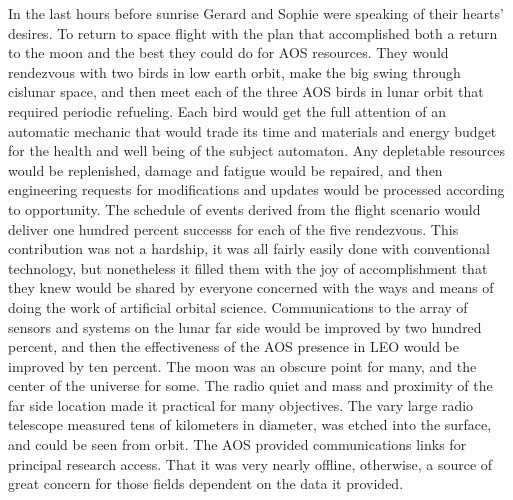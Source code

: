 In the last hours before sunrise Gerard and Sophie were speaking of
their hearts' desires.  To return to space flight with the plan that
accomplished both a return to the moon and the best they could do for
AOS resources.  They would rendezvous with two birds in low earth
orbit, make the big swing through cislunar space, and then meet each
of the three AOS birds in lunar orbit that required periodic
refueling.  Each bird would get the full attention of an automatic
mechanic that would trade its time and materials and energy budget for
the health and well being of the subject automaton.  Any depletable
resources would be replenished, damage and fatigue would be repaired,
and then engineering requests for modifications and updates would be
processed according to opportunity.  The schedule of events derived
from the flight scenario would deliver one hundred percent successs
for each of the five rendezvous.  This contribution was not a
hardship, it was all fairly easily done with conventional technology,
but nonetheless it filled them with the joy of accomplishment that
they knew would be shared by everyone concerned with the ways and
means of doing the work of artificial orbital science.  Communications
to the array of sensors and systems on the lunar far side would be
improved by two hundred percent, and then the effectiveness of the AOS
presence in LEO would be improved by ten percent.  The moon was an
obscure point for many, and the center of the universe for some.  The
radio quiet and mass and proximity of the far side location made it
practical for many objectives.  The vary large radio telescope
measured tens of kilometers in diameter, was etched into the surface,
and could be seen from orbit.  The AOS provided communications links
for principal research access.  That it was very nearly offline,
otherwise, a source of great concern for those fields dependent on the
data it provided.



